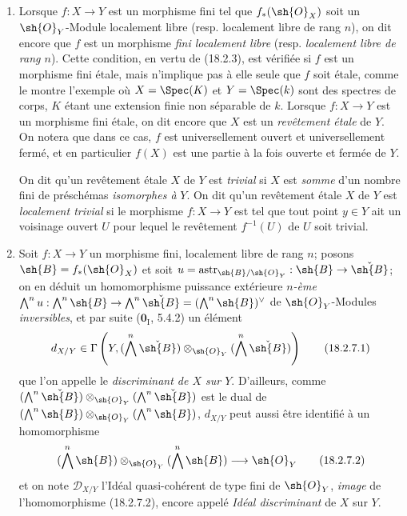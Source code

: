 \begin{remarks}[18.2.7]
\begin{enumerate}
  \item[(i)] Lorsque $f:X\to Y$ est un morphisme fini tel que $f_*(\sh{O}_X)$ soit un $\sh{O}_Y$-Module localement libre (resp. localement libre de rang $n$), on dit encore que $f$ est un morphisme \emph{fini localement libre} (resp. \emph{localement libre de rang $n$}). Cette condition, en vertu de (18.2.3), est vérifiée si $f$ est un morphisme fini étale, mais n'implique pas à elle seule que $f$ soit étale, comme le montre l'exemple où $X=\Spec(K)$ et $Y=\Spec(k)$ sont des spectres de corps, $K$ étant une extension finie non séparable de $k$. Lorsque $f:X\to Y$ est un morphisme fini étale, on dit encore que $X$ est un \emph{revêtement étale} de $Y$. On notera que dans ce cas, $f$ est universellement ouvert et universellement fermé, et en particulier $f(X)$ est une partie à la fois ouverte et fermée de $Y$.

On dit qu'un revêtement étale $X$ de $Y$ est \emph{trivial} si $X$ est \emph{somme} d'un nombre fini de préschémas \emph{isomorphes à} $Y$. On dit qu'un revêtement étale $X$ de $Y$ est \emph{localement trivial} si le morphisme $f:X\to Y$ est tel que tout point $y\in Y$ ait un voisinage ouvert $U$ pour lequel le revêtement $f^{-1}(U)$ de $U$ soit trivial.

  \item[(ii)] Soit $f:X\to Y$ un morphisme fini, localement libre de rang $n$; posons $\sh{B}=f_*(\sh{O}_X)$ et soit $u=\operatorname{astr}_{\sh{B}/\sh{O}_Y}:\sh{B}\to\check{\sh{B}}$; on en déduit un homomorphisme puissance extérieure \emph{$n$-ème}
$\bigwedge^n u:\bigwedge^n\sh{B}\to\bigwedge^n\check{\sh{B}}=(\bigwedge^n\sh{B})^\vee$ de $\sh{O}_Y$-Modules \emph{inversibles}, et par suite ($\mathbf{0}_{\mathrm I}$, 5.4.2) un élément
\begin{equation}
  d_{X/Y}\in\Gamma\left(Y,(\bigwedge^n\check{\sh{B}})\otimes_{\sh{O}_Y}(\bigwedge^n\check{\sh{B}})\right)
  \tag{18.2.7.1}\label{IV.18.2.7.1}
\end{equation}
que l'on appelle le \emph{discriminant de $X$ sur $Y$}. D'ailleurs, comme $(\bigwedge^n\check{\sh{B}})\otimes_{\sh{O}_Y}(\bigwedge^n\check{\sh{B}})$ est le dual de $(\bigwedge^n\sh{B})\otimes_{\sh{O}_Y}(\bigwedge^n\sh{B})$, $d_{X/Y}$ peut aussi être identifié à un homomorphisme
\begin{equation}
  (\bigwedge^n\sh{B})\otimes_{\sh{O}_Y}(\bigwedge^n\sh{B})\longrightarrow\sh{O}_Y
  \tag{18.2.7.2}\label{IV.18.2.7.2}
\end{equation}
et on note $\mathscr{D}_{X/Y}$ l'Idéal quasi-cohérent de type fini de $\sh{O}_Y$, \emph{image} de l'homomorphisme (18.2.7.2), encore appelé \emph{Idéal discriminant} de $X$ sur $Y$.
\end{enumerate}
\end{remarks}

